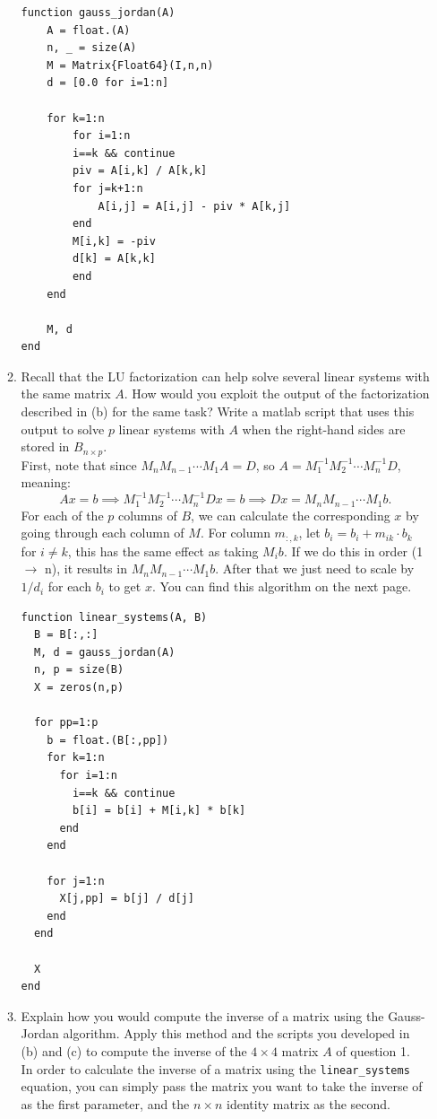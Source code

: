 \documentclass[11pt]{article}
\newcommand{\n}{\vspace{0.3cm}}
\begin{document}
\begin{enumerate}
\begin{enumerate}
\begin{verbatim}
function gauss_jordan(A)
    A = float.(A)
    n, _ = size(A)
    M = Matrix{Float64}(I,n,n)
    d = [0.0 for i=1:n]

    for k=1:n
        for i=1:n
        i==k && continue
        piv = A[i,k] / A[k,k]
        for j=k+1:n
            A[i,j] = A[i,j] - piv * A[k,j]
        end
        M[i,k] = -piv
        d[k] = A[k,k]
        end
    end

    M, d
end
		            \end{verbatim}

		      \item Recall that the LU factorization can help solve several linear systems with the same matrix \(A\).  How would you exploit the output of the factorization described in (b) for the same task?  Write a matlab script that uses this output to solve \(p\) linear systems with \(A\) when the right-hand sides are stored in \(B_{n \times p}\). \n\\
		            First, note that since \(M_n M_{n-1} \cdots M_1 A = D\), so \(A = M_1^{-1}M_2^{-1} \cdots M_n^{-1} D\), meaning:
		            \[Ax = b \implies M_1^{-1}M_2^{-1} \cdots M_n^{-1} Dx = b \implies Dx = M_n M_{n-1} \cdots M_1 b.\]
		            For each of the \(p\) columns of \(B\), we can calculate the corresponding \(x\) by going through each column of \(M\).  For column \(m_{:,k}\), let \(b_i = b_i + m_{ik} \cdot b_k\) for \(i \neq k\), this has the same effect as taking \(M_i b\).  If we do this in order (1 \(\to\) n), it results in \(M_n M_{n-1} \cdots M_1 b\).  After that we just need to scale by \(1/d_i\) for each \(b_i\) to get \(x\).  You can find this algorithm on the next page.
		            \newpage
		            \begin{verbatim}
function linear_systems(A, B)
  B = B[:,:]
  M, d = gauss_jordan(A)
  n, p = size(B)
  X = zeros(n,p)

  for pp=1:p 
    b = float.(B[:,pp])
    for k=1:n 
      for i=1:n 
        i==k && continue
        b[i] = b[i] + M[i,k] * b[k]
      end
    end

    for j=1:n
      X[j,pp] = b[j] / d[j]
    end
  end

  X
end
                \end{verbatim}

		      \item Explain how you would compute the inverse of a matrix using the Gauss-Jordan algorithm.  Apply this method and the scripts you developed in (b) and (c) to compute the inverse of the \(4 \times 4\) matrix \(A\) of question 1. \n\\
		            In order to calculate the inverse of a matrix using the \verb!linear_systems! equation, you can simply pass the matrix you want to take the inverse of as the first parameter, and the \(n \times n\) identity matrix as the second. \n


\end{enumerate}
\end{enumerate}
\end{document}

